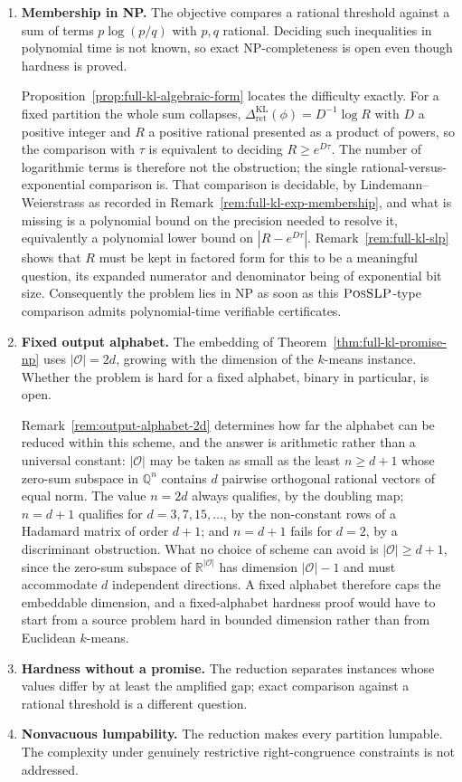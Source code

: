 \documentclass[12pt]{article}
\theoremstyle{definition}
\newcommand{\RetKL}{\Delta_{\mathrm{ret}}^{\mathrm{KL}}}
\begin{document}
\begin{enumerate}[leftmargin=2.0em]
\begin{enumerate}[label=(\alph*),leftmargin=2.0em]
\item \textbf{Membership in NP.}  The objective compares a rational threshold
against a sum of terms $p\log(p/q)$ with $p,q$ rational.  Deciding such
inequalities in polynomial time is not known, so exact NP-completeness is open
even though hardness is proved.

Proposition~\ref{prop:full-kl-algebraic-form} locates the difficulty exactly.
For a fixed partition the whole sum collapses,
$\RetKL(\phi)=D^{-1}\log R$ with $D$ a positive integer and $R$ a positive
rational presented as a product of powers, so the comparison with $\tau$ is
equivalent to deciding $R\ge e^{D\tau}$.  The number of logarithmic terms is
therefore not the obstruction; the single rational-versus-exponential
comparison is.  That comparison is decidable, by
Lindemann--Weierstrass as recorded in
Remark~\ref{rem:full-kl-exp-membership}, and what is missing is a polynomial
bound on the precision needed to resolve it, equivalently a polynomial lower
bound on $|R-e^{D\tau}|$.  Remark~\ref{rem:full-kl-slp} shows that $R$ must be
kept in factored form for this to be a meaningful question, its expanded
numerator and denominator being of exponential bit size.  Consequently the
problem lies in NP as soon as this $\textsc{PosSLP}$-type comparison admits
polynomial-time verifiable certificates.
\item \textbf{Fixed output alphabet.}  The embedding of
Theorem~\ref{thm:full-kl-promise-np} uses $|\mathcal O|=2d$, growing with the
dimension of the $k$-means instance.  Whether the problem is hard for a fixed
alphabet, binary in particular, is open.

Remark~\ref{rem:output-alphabet-2d} determines how far the alphabet can be
reduced within this scheme, and the answer is arithmetic rather than a
universal constant: $|\mathcal O|$ may be taken as small as the least
$n\ge d+1$ whose zero-sum subspace in $\mathbb Q^{n}$ contains $d$ pairwise
orthogonal rational vectors of equal norm.  The value $n=2d$ always qualifies,
by the doubling map; $n=d+1$ qualifies for $d=3,7,15,\dots$, by the
non-constant rows of a Hadamard matrix of order $d+1$; and $n=d+1$ fails for
$d=2$, by a discriminant obstruction.  What no choice of scheme can avoid is
$|\mathcal O|\ge d+1$, since the zero-sum subspace of
$\mathbb R^{|\mathcal O|}$ has dimension $|\mathcal O|-1$ and must accommodate
$d$ independent directions.  A fixed alphabet therefore caps the embeddable
dimension, and a fixed-alphabet hardness proof would have to start from a
source problem hard in bounded dimension rather than from Euclidean
$k$-means.
\item \textbf{Hardness without a promise.}  The reduction separates instances
whose values differ by at least the amplified gap; exact comparison against a
rational threshold is a different question.
\item \textbf{Nonvacuous lumpability.}  The reduction makes every partition
lumpable.  The complexity under genuinely restrictive right-congruence
constraints is not addressed.
\end{enumerate}


\end{enumerate}
\end{document}
